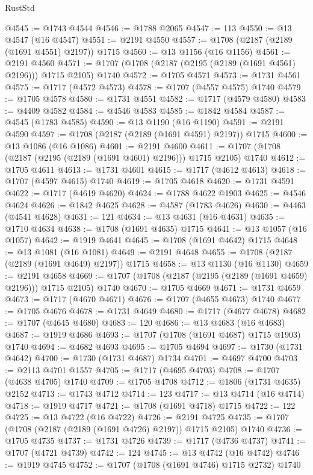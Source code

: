\begin{lexlean}{RustStd}
\begin{coremodule}
@4545 := @1743 @4544
@4546 := @1788 @2065
@4547 := 113
@4550 := @13 @4547 (@16 @4547)
@4551 := @2191 @4550
@4557 := @1708 (@2187 (@2189 (@1691 @4551) @2197)) @1715
@4560 := @13 @1156 (@16 @1156)
@4561 := @2191 @4560
@4571 := @1707 (@1708 (@2187 (@2195 (@2189 (@1691 @4561) @2196))) @1715 @2105) @1740
@4572 := @1705 @4571
@4573 := @1731 @4561
@4575 := @1717 (@4572 @4573)
@4578 := @1707 (@4557 @4575) @1740
@4579 := @1705 @4578
@4580 := @1731 @4551
@4582 := @1717 (@4579 @4580)
@4583 := @4409 @4582
@4584 := @4546 @4583
@4585 := @1842 @4584
@4587 := @4545 (@1783 @4585)
@4590 := @13 @1190 (@16 @1190)
@4591 := @2191 @4590
@4597 := @1708 (@2187 (@2189 (@1691 @4591) @2197)) @1715
@4600 := @13 @1086 (@16 @1086)
@4601 := @2191 @4600
@4611 := @1707 (@1708 (@2187 (@2195 (@2189 (@1691 @4601) @2196))) @1715 @2105) @1740
@4612 := @1705 @4611
@4613 := @1731 @4601
@4615 := @1717 (@4612 @4613)
@4618 := @1707 (@4597 @4615) @1740
@4619 := @1705 @4618
@4620 := @1731 @4591
@4622 := @1717 (@4619 @4620)
@4624 := @1788 @4622 @1903
@4625 := @4546 @4624
@4626 := @1842 @4625
@4628 := @4587 (@1783 @4626)
@4630 := @4463 (@4541 @4628)
@4631 := 121
@4634 := @13 @4631 (@16 @4631)
@4635 := @1710 @4634
@4638 := @1708 (@1691 @4635) @1715
@4641 := @13 @1057 (@16 @1057)
@4642 := @1919 @4641
@4645 := @1708 (@1691 @4642) @1715
@4648 := @13 @1081 (@16 @1081)
@4649 := @2191 @4648
@4655 := @1708 (@2187 (@2189 (@1691 @4649) @2197)) @1715
@4658 := @13 @1130 (@16 @1130)
@4659 := @2191 @4658
@4669 := @1707 (@1708 (@2187 (@2195 (@2189 (@1691 @4659) @2196))) @1715 @2105) @1740
@4670 := @1705 @4669
@4671 := @1731 @4659
@4673 := @1717 (@4670 @4671)
@4676 := @1707 (@4655 @4673) @1740
@4677 := @1705 @4676
@4678 := @1731 @4649
@4680 := @1717 (@4677 @4678)
@4682 := @1707 (@4645 @4680)
@4683 := 120
@4686 := @13 @4683 (@16 @4683)
@4687 := @1919 @4686
@4693 := @1707 (@1708 (@1691 @4687) @1715 @1903) @1740
@4694 := @4682 @4693
@4695 := @1705 @4694
@4697 := @1730 (@1731 @4642)
@4700 := @1730 (@1731 @4687) @1734
@4701 := @4697 @4700
@4703 := @2113 @4701 @1557
@4705 := @1717 (@4695 @4703)
@4708 := @1707 (@4638 @4705) @1740
@4709 := @1705 @4708
@4712 := @1806 (@1731 @4635) @2152
@4713 := @1743 @4712
@4714 := 123
@4717 := @13 @4714 (@16 @4714)
@4718 := @1919 @4717
@4721 := @1708 (@1691 @4718) @1715
@4722 := 122
@4725 := @13 @4722 (@16 @4722)
@4726 := @2191 @4725
@4735 := @1707 (@1708 (@2187 (@2189 (@1691 @4726) @2197)) @1715 @2105) @1740
@4736 := @1705 @4735
@4737 := @1731 @4726
@4739 := @1717 (@4736 @4737)
@4741 := @1707 (@4721 @4739)
@4742 := 124
@4745 := @13 @4742 (@16 @4742)
@4746 := @1919 @4745
@4752 := @1707 (@1708 (@1691 @4746) @1715 @2732) @1740

\end{coremodule}
\end{lexlean}
